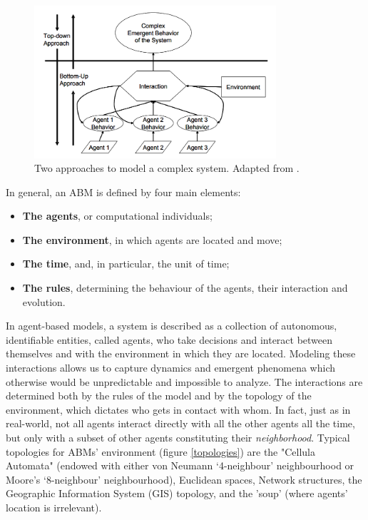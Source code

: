 \begin{figure}
    \centering
    \includegraphics[width=0.8\textwidth]{tex/pics/abm_bottomup.png}
    \caption{Two approaches to model a complex system. Adapted from \textcite{bernhardt2007agent}.}
    \label{abm_bu}
\end{figure}

In general, an ABM is defined by four main elements:
\begin{itemize}
    \item \textbf{The agents}, or computational individuals;
    \item \textbf{The environment}, in which agents are located and move;
    \item \textbf{The time}, and, in particular, the unit of time;
    \item \textbf{The rules}, determining the behaviour of the agents, their interaction and evolution.
\end{itemize}
In agent-based models, a system is described as a collection of autonomous, identifiable entities, called agents, who take decisions and interact between themselves and with the environment in which they are located. Modeling these interactions allows us to capture dynamics and emergent phenomena which otherwise would be unpredictable and impossible to analyze. The interactions are determined both by the rules of the model and by the topology of the environment, which dictates who gets in contact with whom. In fact, just as in real-world, not all agents interact directly with all the other agents all the time, but only with a subset of other agents constituting their \textit{neighborhood}. Typical topologies for ABMs' environment (figure \ref{topologies}) are the "Cellula Automata" (endowed with either von Neumann ‘4-neighbour’ neighbourhood or Moore's ‘8-neighbour’ neighbourhood), Euclidean spaces, Network structures, the Geographic Information System (GIS) topology, and the 'soup' (where agents' location is irrelevant).  \\

